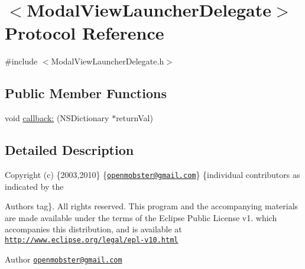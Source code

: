 \hypertarget{protocol_modal_view_launcher_delegate-p}{
\section{$<$\-Modal\-View\-Launcher\-Delegate$>$ \-Protocol \-Reference}
\label{protocol_modal_view_launcher_delegate-p}
}


{\ttfamily \#include $<$\-Modal\-View\-Launcher\-Delegate.\-h$>$}

\subsection*{\-Public \-Member \-Functions}
\begin{DoxyCompactItemize}
\item 
void \hyperlink{protocol_modal_view_launcher_delegate-p_ac547c4fd2fe4c22f4b5fc0fff92c14c1}{callback\-:} (\-N\-S\-Dictionary $\ast$return\-Val)
\end{DoxyCompactItemize}


\subsection{\-Detailed \-Description}
\-Copyright (c) \{2003,2010\} \{\href{mailto:openmobster@gmail.com}{\tt openmobster@gmail.\-com}\} \{individual contributors as indicated by the \begin{DoxyAuthor}{\-Authors}
tag\}. \-All rights reserved. \-This program and the accompanying materials are made available under the terms of the \-Eclipse \-Public \-License v1. which accompanies this distribution, and is available at \href{http://www.eclipse.org/legal/epl-v10.html}{\tt http\-://www.\-eclipse.\-org/legal/epl-\/v10.\-html}
\end{DoxyAuthor}
\begin{DoxyAuthor}{\-Author}
\href{mailto:openmobster@gmail.com}{\tt openmobster@gmail.\-com} 
\end{DoxyAuthor}


